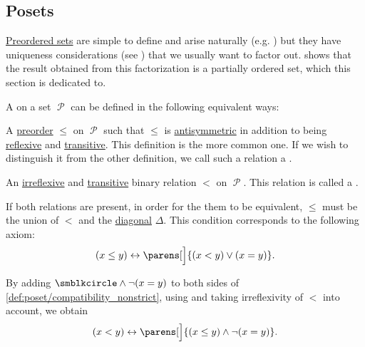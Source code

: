 \subsection{Posets}\label{subsec:posets}

\hyperref[def:preordered_set]{Preordered sets} are simple to define and arise naturally (e.g. ) but they have uniqueness considerations (see ) that we usually want to factor out.  shows that the result obtained from this factorization is a partially ordered set, which this section is dedicated to.

\begin{definition}\label{def:poset}
  A  on a set \( \mscrP \) can be defined in the following equivalent ways:
  \begin{thmenum}[series=def:poset]
     A \hyperref[def:preordered_set]{preorder} \( \leq \) on \( \mscrP \) such that \( \leq \) is \hyperref[def:binary_relation/antisymmetric]{antisymmetric} in addition to being \hyperref[def:binary_relation/reflexive]{reflexive} and \hyperref[def:binary_relation/transitive]{transitive}. This definition is the more common one. If we wish to distinguish it from the other definition, we call such a relation a .

     An \hyperref[def:binary_relation/irreflexive]{irreflexive} and \hyperref[def:binary_relation/transitive]{transitive} binary relation \( < \) on \( \mscrP \). This relation is called a .
  \end{thmenum}

  If both relations are present, in order for the them to be equivalent, \( \leq \) must be the union of \( < \) and the \hyperref[def:binary_relation/diagonal]{diagonal} \( \Delta \). This condition corresponds to the following axiom:
  \begin{equation}\label{def:poset/compatibility_nonstrict}
    (x \leq y) \leftrightarrow \parens[\Big]{(x < y) \vee (x = y)}.
  \end{equation}

  By adding \( \placeholder \wedge \neg (x = y) \) to both sides of \eqref{def:poset/compatibility_nonstrict}, using  and taking irreflexivity of \( < \) into account, we obtain
  \begin{equation}\label{def:poset/compatibility_strict}
    (x < y) \leftrightarrow \parens[\Big]{(x \leq y) \wedge \neg (x = y)}.
  \end{equation}


\end{definition}
